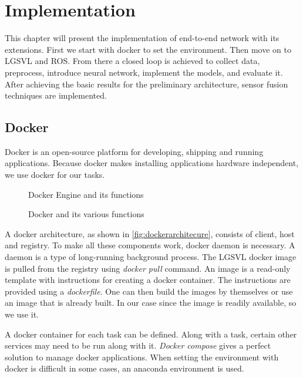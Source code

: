 \chapter{Implementation}
\label{chapter:implementation}
This chapter will present the implementation of end-to-end network with its extensions.
First we start with docker to set the environment. Then move on to LGSVL and ROS.
From there a closed loop is achieved to collect data, preprocess, introduce neural
network, implement the models, and evaluate it. After achieving the basic results for the
preliminary architecture, sensor fusion techniques are implemented.

\section{Docker}
Docker is an open-source platform for developing, shipping and running applications.
Because docker makes installing applications hardware independent, we use docker for our
tasks.
\begin{wrapfigure}{l}{0.5\textwidth}
	\centering
    \def\svgwidth{0.5\textwidth}
    \caption{Docker Engine and its functions}
    \label{fig:dockerengine}
\end{wrapfigure}


\begin{figure}
	\centering
    \def\svgwidth{\textwidth}
    \caption{Docker and its various functions}
    \label{fig:docker1}
\end{figure}

A docker architecture, as shown in \ref{fig:dockerarchitecure}, consists of client, host
and registry. To make all these components work, docker daemon is necessary. A daemon is a
type of long-running background process. The LGSVL docker image is pulled from the registry using
\textit{docker pull} command. An image is a read-only template with instructions for
creating a docker container. The instructions are provided using a \textit{dockerfile}.
One can then build the images by themselves or use an image that is already built. In our
case since the image is readily available, so we use it.

A docker container for each task can be defined. Along with a task, certain other
services may need to be run along with it. \textit{Docker compose} gives a perfect
solution to manage docker applications.  When setting the environment with docker is difficult in some cases, an anaconda
environment \cite{anacondaenv} is used.


